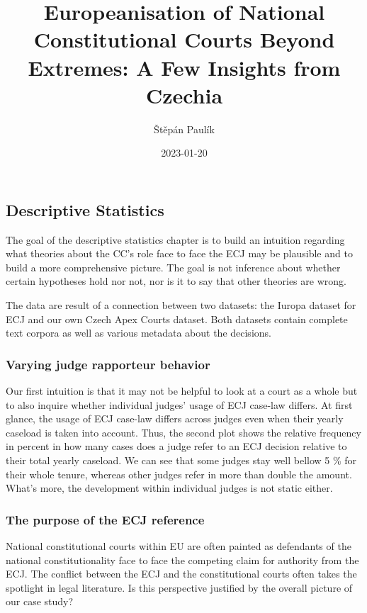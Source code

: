\documentclass[
]{article}
\title{Europeanisation of National Constitutional Courts Beyond
Extremes: A Few Insights from Czechia}
\author{Štěpán Paulík}
\date{2023-01-20}
\begin{document}
\maketitle

\hypertarget{descriptive-statistics}{%
\subsection{Descriptive Statistics}\label{descriptive-statistics}}

The goal of the descriptive statistics chapter is to build an intuition
regarding what theories about the CC's role face to face the ECJ may be
plausible and to build a more comprehensive picture. The goal is not
inference about whether certain hypotheses hold nor not, nor is it to
say that other theories are wrong.

The data are result of a connection between two datasets: the Iuropa
dataset for ECJ and our own Czech Apex Courts dataset. Both datasets
contain complete text corpora as well as various metadata about the
decisions.

\hypertarget{varying-judge-rapporteur-behavior}{%
\subsubsection{Varying judge rapporteur
behavior}\label{varying-judge-rapporteur-behavior}}

Our first intuition is that it may not be helpful to look at a court as
a whole but to also inquire whether individual judges' usage of ECJ
case-law differs. At first glance, the usage of ECJ case-law differs
across judges even when their yearly caseload is taken into account.
Thus, the second plot shows the relative frequency in percent in how
many cases does a judge refer to an ECJ decision relative to their total
yearly caseload. We can see that some judges stay well bellow 5 \% for
their whole tenure, whereas other judges refer in more than double the
amount. What's more, the development within individual judges is not
static either.

\hypertarget{the-purpose-of-the-ecj-reference}{%
\subsubsection{The purpose of the ECJ
reference}\label{the-purpose-of-the-ecj-reference}}

National constitutional courts within EU are often painted as defendants
of the national constitutionality face to face the competing claim for
authority from the ECJ. The conflict between the ECJ and the
constitutional courts often takes the spotlight in legal literature. Is
this perspective justified by the overall picture of our case study?
\end{document}

